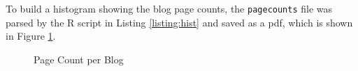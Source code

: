 

To build a histogram showing the blog page counts, the {\tt pagecounts} file was parsed by the R script in Listing \ref{listing:hist} and saved as a pdf, which is shown in Figure \ref{fig:hist}.



\clearpage

\begin{figure}[h!]
\centering
{}
\caption{Page Count per Blog}
\label{fig:hist}
\end{figure}